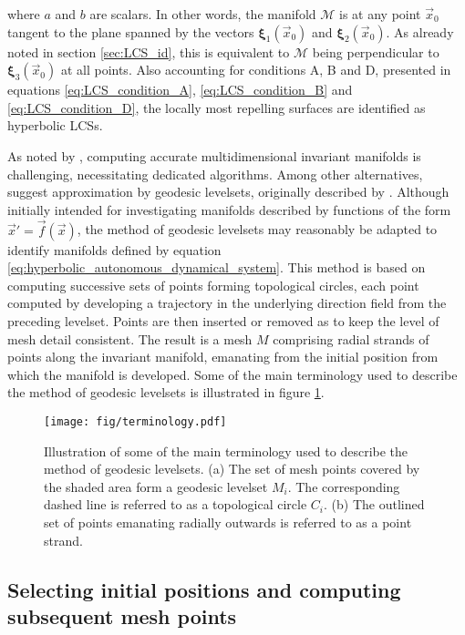 \noindent where $a$ and $b$ are scalars. In other words, the manifold $\mathcal{M}$ is at any point $\vec{x}_0$ tangent to the plane spanned by the vectors $\bm{\xi}_1(\vec{x}_0)$ and $\bm{\xi}_2(\vec{x}_0)$. As already noted in section \ref{sec:LCS_id}, this is equivalent to $\mathcal{M}$ being perpendicular to $\bm{\xi}_3(\vec{x}_0)$ at all points. Also accounting for conditions A, B and D, presented in equations \eqref{eq:LCS_condition_A}, \eqref{eq:LCS_condition_B} and \eqref{eq:LCS_condition_D}, the locally most repelling surfaces are identified as hyperbolic LCSs.

As noted by \cite{Survey}, computing accurate multidimensional invariant manifolds is challenging, necessitating dedicated algorithms. Among other alternatives, \cite{Survey} suggest approximation by geodesic levelsets, originally described by \cite{GeodesicLevelSets}. Although initially intended for investigating manifolds described by functions of the form $\vec{x}'=\vec{f}(\vec{x})$, the method of geodesic levelsets may reasonably be adapted to identify manifolds defined by equation \eqref{eq:hyperbolic_autonomous_dynamical_system}. This method is based on computing successive sets of points forming topological circles, each point computed by developing a trajectory in the underlying direction field from the preceding levelset. Points are then inserted or removed as to keep the level of mesh detail consistent. The result is a mesh $M$ comprising radial strands of points along the invariant manifold, emanating from the initial position from which the manifold is developed. Some of the main terminology used to describe the method of geodesic levelsets is illustrated in figure \ref{fig:terminology}.

\begin{figure}[h!] 
\centering
\texttt{[image: fig/terminology.pdf]}
\caption{Illustration of some of the main terminology used to describe the method of geodesic levelsets. (a) The set of mesh points covered by the shaded area form a geodesic levelset $M_i$. The corresponding dashed line is referred to as a topological circle $C_i$. (b) The outlined set of points emanating radially outwards is referred to as a point strand.}\label{fig:terminology}
\end{figure}

\subsection{Selecting initial positions and computing subsequent mesh points}\label{sec:GLS_overview}

